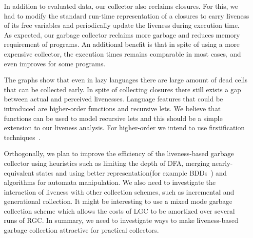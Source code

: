 \documentclass[9pt]{sigplanconf}
\begin{document}
In addition to  evaluated data, our collector  also reclaims closures.
For this, we  had to modify the standard run-time  representation of a
closures  to carry  liveness  of its free  variables and  periodically
update the liveness during execution  time.  As expected, our garbage
collector  reclaims more  garbage and  reduces memory  requirement of
programs.  An  additional benefit is  that in  spite of using  a more
expensive collector, the execution times remains comparable in
most cases, and even improves for some programs.


The graphs show that even in lazy languages there are large amount of
dead cells that can be collected early. In spite of collecting
closures there still exists a gap between actual and perceived
livenesses.
Language features that could be introduced are higher-order functions
and recursive lets. We believe that functions can be used to model
recursive lets and this should be a simple extension to our liveness
analysis.
For higher-order we intend to use firstification techniques~\cite{Mitchell:2009}. 
 

  Orthogonally, we  plan to  improve the  efficiency of
  the liveness-based garbage collector using heuristics
  such   as  limiting   the  depth   of  DFA,   merging
  nearly-equivalent    states    and    using    better
  representation(for example BDDs~\cite{Bryant86})    and    algorithms   for    automata
  manipulation.  We   also  need  to   investigate  the
  interaction   of  liveness   with  other   collection
  schemes,   such  as   incremental  and   generational
  collection.  It might be interesting to use a mixed mode garbage collection
  scheme which allows the costs of LGC to be amortized over several runs
  of RGC. In summary, we  need to investigate ways
  to make liveness-based garbage collection attractive
  for practical collectors.


\clearpage
\balance
{}

\clearpage
\end{document}
